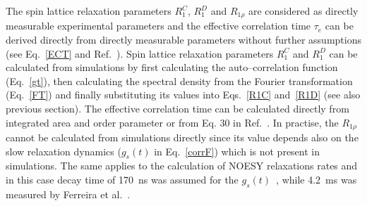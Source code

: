 \documentclass[aps,prl,superscriptaddress,twocolumn]{revtex4}
\begin{document}
The spin lattice relaxation parameters $R_1^{C}$, $R_1^{D}$ and $R_{1\rho}$ are considered as
directly measurable experimental parameters and the effective correlation time $\tau_e$ can be derived directly
from directly measurable parameters without further assumptions (see Eq.~\ref{ECT} and Ref.~\cite{ferreira15}).
Spin lattice relaxation parameters $R_1^{C}$ and $R_1^{D}$ can be calculated from simulations
by first calculating the auto--correlation function (Eq.~\ref{gt}), then calculating the spectral
density from the Fourier transformation (Eq.~\ref{FT}) and finally substituting its values into
Eqs.~\ref{R1C} and~\ref{R1D} (see also previous section). The effective correlation time can be calculated
directly from integrated area and order parameter or from Eq. 30 in Ref.~\cite{ferreira15}.
In practise, the $R_{1\rho}$ cannot be calculated from simulations directly since its value depends
also on the slow relaxation dynamics ($g_s(t)$ in Eq.~\ref{corrF}) which is not present in simulations.
The same applies to the calculation of NOESY relaxations rates and in this case decay time of 170~ns was assumed for the
$g_s(t)$~\cite{feller99}, while 4.2~ms was measured by Ferreira et al.~\cite{ferreira15}.
\end{document}
